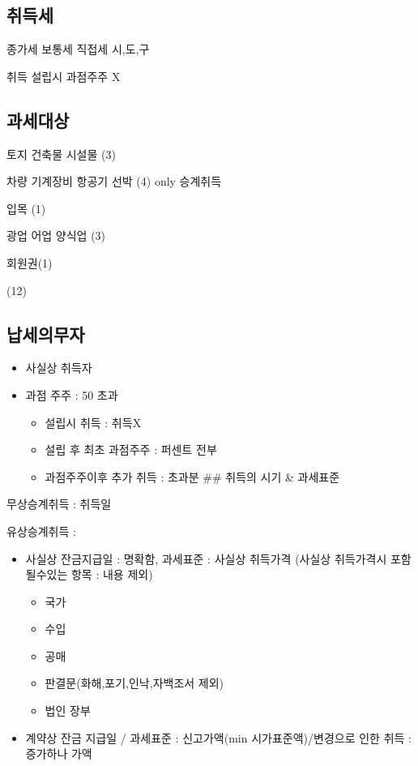 \documentclass{oblivoir}
\begin{document}
\begin{multicols}{2}

\section{취득세}\label{uxcde8uxb4dduxc138}

종가세 보통세 직접세 시,도,구

취득 설립시 과점주주 X

\subsection{과세대상}\label{uxacfcuxc138uxb300uxc0c1}

토지 건축물 시설물 (3)

차량 기계장비 항공기 선박 (4) only 승계취득

입목 (1)

광업 어업 양식업 (3)

회원권(1)

(12)

\subsection{납세의무자}\label{uxb0a9uxc138uxc758uxbb34uxc790}

\begin{itemize}
\itemsep1pt\parskip0pt
\item
  사실상 취득자
\item
  과점 주주 : 50 초과

  \begin{itemize}
  \itemsep1pt\parskip0pt
  \item
    설립시 취득 : 취득X
  \item
    설립 후 최초 과점주주 : 퍼센트 전부
  \item
    과점주주이후 추가 취득 : 초과분 \#\# 취득의 시기 \& 과세표준
  \end{itemize}
\end{itemize}

무상승계취득 : 취득일

유상승계취득 :

\begin{itemize}
\itemsep1pt\parskip0pt
\item
  사실상 잔금지급일 : 명확함, 과세표준 : 사실상 취득가격 (사실상
  취득가격시 포함 될수있는 항목 : 내용 제외)

  \begin{itemize}
  \itemsep1pt\parskip0pt
  \item
    국가
  \item
    수입
  \item
    공매
  \item
    판결문(화해,포기,인낙,자백조서 제외)
  \item
    법인 장부
  \end{itemize}
\item
  계약상 잔금 지급일 / 과세표준 : 신고가액(min 시가표준액)/변경으로 인한
  취득 : 증가하나 가액


\end{itemize}
\end{multicols}
\end{document}
